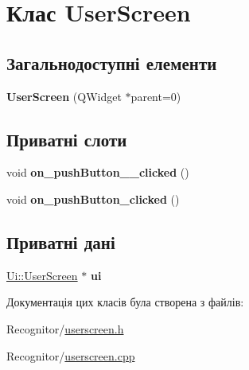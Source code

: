 \hypertarget{classUserScreen}{\section{Клас User\-Screen}
\label{classUserScreen}
}
\subsection*{Загальнодоступні елементи}
\begin{DoxyCompactItemize}
\item 
\hypertarget{classUserScreen_a27136456b8f1b4d10dfe1cbfc9c43d7c}{{\bfseries User\-Screen} (Q\-Widget $\ast$parent=0)}\label{classUserScreen_a27136456b8f1b4d10dfe1cbfc9c43d7c}

\end{DoxyCompactItemize}
\subsection*{Приватні слоти}
\begin{DoxyCompactItemize}
\item 
\hypertarget{classUserScreen_a6e25c29ff53726317f4056b66fcb9a18}{void {\bfseries on\-\_\-push\-Button\-\_\-\_\-clicked} ()}\label{classUserScreen_a6e25c29ff53726317f4056b66fcb9a18}

\item 
\hypertarget{classUserScreen_a6e79ba614aa7a1af1520cc78d5e7c264}{void {\bfseries on\-\_\-push\-Button\-\_\-clicked} ()}\label{classUserScreen_a6e79ba614aa7a1af1520cc78d5e7c264}

\end{DoxyCompactItemize}
\subsection*{Приватні дані}
\begin{DoxyCompactItemize}
\item 
\hypertarget{classUserScreen_ade24b1857f428a1a247fd622a51c8de8}{\hyperlink{classUi_1_1UserScreen}{Ui\-::\-User\-Screen} $\ast$ {\bfseries ui}}\label{classUserScreen_ade24b1857f428a1a247fd622a51c8de8}

\end{DoxyCompactItemize}


Документація цих класів була створена з файлів\-:\begin{DoxyCompactItemize}
\item 
Recognitor/\hyperlink{userscreen_8h}{userscreen.\-h}\item 
Recognitor/\hyperlink{userscreen_8cpp}{userscreen.\-cpp}\end{DoxyCompactItemize}
